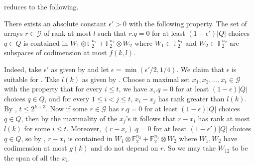 \documentclass{toc}
\newcommand\eps{\epsilon}  %
\newcommand\F{\mathbb{F}}
\newcommand \cG{\mathcal G}
\newcommand \s{\subset}
\begin{document}
 reduces  to the following.

\begin{lemma} \label{reduced}
	There exists an absolute constant $\eps'>0$ with the following property. The set of arrays $r\in \cG$ of rank at most $l$ such that $r.q=0$ for at least $(1-\eps')|Q|$ choices $q\in Q$ is contained in $W_1\otimes \F_2^{n_2}+\F_2^{n_1}\otimes W_2$ where $W_1\s \F_2^{n_1}$ and $W_2\s \F_2^{n_2}$ are subspaces of codimension at most $f(k,l)$.
\end{lemma}

Indeed, take $\eps'$ as given by  and let $\eps=\min(\eps'/2,1/4)$. We claim that $\eps$ is suitable for . Take $l(k)$ as given by .
Choose a maximal set $x_1,x_2,\dots,x_t\in \cG$ with the property that for every $i\leq t$, we have $x_i.q=0$ for at least $(1-\eps)|Q|$ choices $q\in Q$, and for every $1\leq i<j\leq t$, $x_i-x_j$ has rank greater than $l(k)$. By , $t\leq 2^{k+3}$. Now if some $r\in \cG$ has $r.q=0$ for at least $(1-\eps)|Q|$ choices $q\in Q$, then by the maximality of the $x_j$'s it follows that $r-x_i$ has rank at most $l(k)$ for some $i\leq t$. Moreover, $(r-x_i).q=0$ for at least $(1-\eps')|Q|$ choices $q\in Q$, so by , $r-x_i$ is contained in $W_1\otimes \F_2^{n_2}+\F_2^{n_1}\otimes W_2$ where $W_1,W_2$ have codimension at most $g(k)$ and do not depend on $r$. So we may take $W_{12}$ to be the span of all the $x_i$.
%
\end{document}
